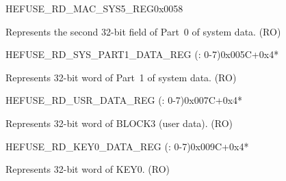 \begin{register}{H}{EFUSE\_RD\_MAC\_SYS5\_REG}{0x0058}\label{regdesc:EFUSERDMACSYS5REG}
%
\regnewline%
\begin{regdesc}\begin{reglist}
\label{fielddesc:EFUSESYSDATAPART02}\item [EFUSE\_SYS\_DATA\_PART0\_2] Represents the second 32-bit field of Part~0 of system data. (RO)
\end{reglist}\end{regdesc}
\end{register}


\begin{register}{H}{EFUSE\_RD\_SYS\_PART1\_DATA\_REG (: 0-7)}{0x005C+0x4*}\label{regdesc:EFUSERDSYSPART1DATANREG}
%
\regnewline%
\begin{regdesc}\begin{reglist}
\label{fielddesc:EFUSESYSDATAPART1N}\item [EFUSE\_SYS\_DATA\_PART1\_\regindex{n}] Represents 32-bit word  of Part~1 of system data. (RO)
\end{reglist}\end{regdesc}
\end{register}


\begin{register}{H}{EFUSE\_RD\_USR\_DATA\_REG (: 0-7)}{0x007C+0x4*}\label{regdesc:EFUSERDUSRDATANREG}
%
\regnewline%
\begin{regdesc}\begin{reglist}
\label{fielddesc:EFUSEUSRDATAN}\item [EFUSE\_USR\_DATA\regindex{n}] Represents 32-bit word  of BLOCK3 (user data). (RO)
\end{reglist}\end{regdesc}
\end{register}


\begin{register}{H}{EFUSE\_RD\_KEY0\_DATA\_REG (: 0-7)}{0x009C+0x4*}\label{regdesc:EFUSERDKEY0DATANREG}
%
\regnewline%
\begin{regdesc}\begin{reglist}
\label{fielddesc:EFUSEKEY0DATAN}\item [EFUSE\_KEY0\_DATA\regindex{n}] Represents 32-bit word  of KEY0. (RO)
\end{reglist}\end{regdesc}
\end{register}


